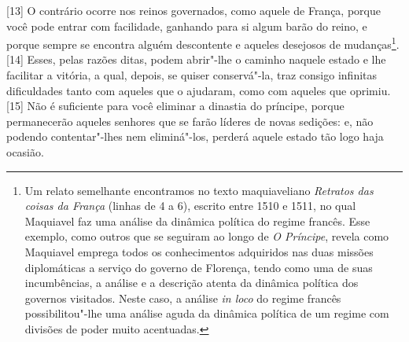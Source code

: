 {[}13{]} O contrário ocorre nos reinos governados, como aquele de
França, porque você pode entrar com facilidade, ganhando para si algum
barão do reino, e porque sempre se encontra alguém descontente e aqueles
desejosos de mudanças\footnote{Um relato semelhante encontramos no texto
  maquiaveliano \emph{Retratos das coisas da França} (linhas de 4 a 6),
  escrito entre 1510 e 1511, no qual Maquiavel faz uma análise da
  dinâmica política do regime francês. Esse exemplo, como outros que se
  seguiram ao longo de \emph{O Príncipe}, revela como Maquiavel emprega
  todos os conhecimentos adquiridos nas duas missões diplomáticas a
  serviço do governo de Florença, tendo como uma de suas incumbências, a
  análise e a descrição atenta da dinâmica política dos governos
  visitados. Neste caso, a análise \emph{in loco} do regime francês
  possibilitou"-lhe uma análise aguda da dinâmica política de um regime
  com divisões de poder muito acentuadas.}. {[}14{]} Esses, pelas razões
ditas, podem abrir"-lhe o caminho naquele estado e lhe facilitar a
vitória, a qual, depois, se quiser conservá"-la, traz consigo infinitas
dificuldades tanto com aqueles que o ajudaram, como com aqueles que
oprimiu. {[}15{]} Não é suficiente para você eliminar a dinastia do
príncipe, porque permanecerão aqueles senhores que se farão líderes de
novas sedições: e, não podendo contentar"-lhes nem eliminá"-los, perderá
aquele estado tão logo haja ocasião.

